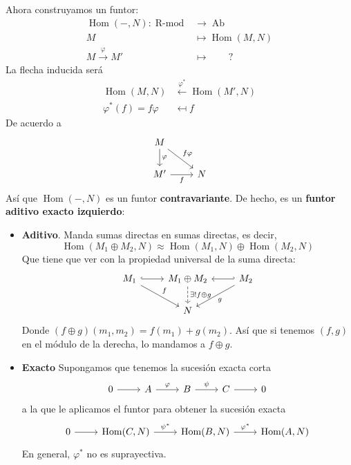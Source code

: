 \documentclass[spanish]{book}
\theoremstyle{definition}
\DeclareMathOperator{\RMod}{R\text{-}mod}
\DeclareMathOperator{\Ab}{Ab}
\DeclareMathOperator{\Hom}{Hom}
\begin{document}
Ahora construyamos un funtor:
\begin{align*}
	\Hom(-,N):\RMod&\to\Ab\\
	M&\mapsto\Hom(M,N)\\
	M\xrightarrow{\varphi} M'&\mapsto \qquad?
\end{align*}
La flecha inducida será
\begin{align*}
	\Hom(M,N)&\xleftarrow{\varphi^*}\Hom(M',N)\\
	\varphi^*(f)=f\varphi&\mapsfrom f
\end{align*}
De acuerdo a
\[\begin{tikzcd}
	M\arrow[d,"\varphi"]\arrow[rd,"f\varphi"]\\
	M'\arrow[r,swap,"f"]&N
\end{tikzcd}\]
Así que $\Hom(-,N)$ es un funtor \textbf{contravariante}. De hecho, es un \textbf{funtor aditivo exacto izquierdo}:
\begin{itemize}
	\item \textbf{Aditivo}. Manda sumas directas en sumas directas, es decir,
	\[\Hom(M_1\oplus M_2,N)\approx \Hom(M_1,N)\oplus\Hom(M_2,N)\]
	Que tiene que ver con la propiedad universal de la suma directa:
	\[\begin{tikzcd}
		M_1\arrow[r,hook]\arrow[rd,"f"]&M_1\oplus M_2\arrow[d,dashed,"\exists! f\oplus g"]&M_2\arrow[l,hook']\arrow[dl,"g"]\\
		&N
	\end{tikzcd}\]
	Donde $(f\oplus g)(m_1,m_2)=f(m_1)+g(m_2)$. Así que si tenemos $(f,g)$ en el módulo de la derecha, lo mandamos a $f\oplus g$.
	\item \textbf{Exacto} Supongamos que tenemos la sucesión exacta corta
	\[\begin{tikzcd}
		0\arrow[r]&A\arrow[r,"\varphi"]&B\arrow[r,"\psi"]&C\arrow[r]&0
	\end{tikzcd}\]
	a la que le aplicamos el funtor para obtener la sucesión exacta
	\[\begin{tikzcd}
		0\arrow[r]&\Hom(C,N)\arrow[r,"\psi^*"]&\Hom(B,N)\arrow[r,"\varphi^*"]&\Hom(A,N)
	\end{tikzcd}\]
	En general, $\varphi^*$ no es suprayectiva.
\end{itemize}
\end{document}
